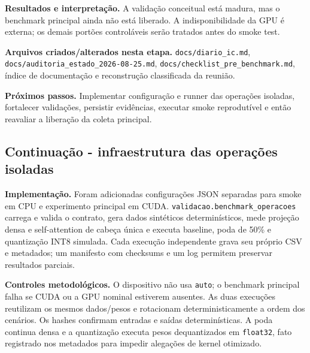 \textbf{Resultados e interpretação.} A validação conceitual está madura, mas o benchmark principal ainda não está liberado. A indisponibilidade da GPU é externa; os demais portões controláveis serão tratados antes do smoke test.





\textbf{Arquivos criados/alterados nesta etapa.} \texttt{docs/\allowbreak{}diario\_\allowbreak{}ic.\allowbreak{}md}, \texttt{docs/\allowbreak{}auditoria\_\allowbreak{}estado\_\allowbreak{}2026-08-25.\allowbreak{}md}, \texttt{docs/\allowbreak{}checklist\_\allowbreak{}pre\_\allowbreak{}benchmark.\allowbreak{}md}, índice de documentação e reconstrução classificada da reunião.





\textbf{Próximos passos.} Implementar configuração e runner das operações isoladas, fortalecer validações, persistir evidências, executar smoke reprodutível e então reavaliar a liberação da coleta principal.



\subsection{Continuação - infraestrutura das operações isoladas}








\textbf{Implementação.} Foram adicionadas configurações JSON separadas para smoke em CPU e experimento principal em CUDA. \texttt{validacao.\allowbreak{}benchmark\_\allowbreak{}operacoes} carrega e valida o contrato, gera dados sintéticos determinísticos, mede projeção densa e self-attention de cabeça única e executa baseline, poda de 50\% e quantização INT8 simulada. Cada execução independente grava seu próprio CSV e metadados; um manifesto com checksums e um log permitem preservar resultados parciais.








\textbf{Controles metodológicos.} O dispositivo não usa \texttt{auto}; o benchmark principal falha se CUDA ou a GPU nominal estiverem ausentes. As duas execuções reutilizam os mesmos dados/pesos e rotacionam deterministicamente a ordem dos cenários. Os hashes confirmam entradas e saídas determinísticas. A poda continua densa e a quantização executa pesos dequantizados em \texttt{float32}, fato registrado nos metadados para impedir alegações de kernel otimizado.





